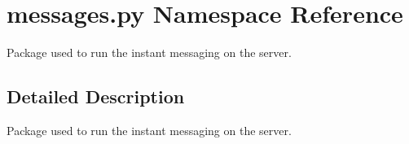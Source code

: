 \hypertarget{namespacemessages_1_1py}{}\section{messages.\+py Namespace Reference}
\label{namespacemessages_1_1py}


Package used to run the instant messaging on the server.  




\subsection{Detailed Description}
Package used to run the instant messaging on the server. 